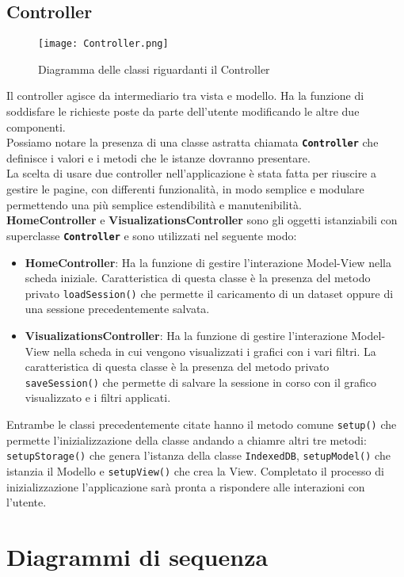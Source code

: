 \subsection{Controller}
\begin{figure}[ht]
	\centering
	\texttt{[image: Controller.png]}
	\caption{Diagramma delle classi riguardanti il Controller}
  \end{figure}
\label{controller}Il controller agisce da intermediario tra vista e modello. Ha la funzione di soddisfare le richieste poste da parte dell'utente modificando le altre due componenti.\\
Possiamo notare la presenza di una classe astratta chiamata \textbf{\texttt{Controller}} che definisce i valori e i metodi che le istanze dovranno presentare.\\
La scelta di usare due controller nell'applicazione è stata fatta per riuscire a gestire le pagine, con differenti funzionalità, in modo semplice e modulare permettendo una più semplice estendibilità e manutenibilità.\\
\textbf{HomeController} e \textbf{VisualizationsController} sono gli oggetti istanziabili con superclasse \textbf{\texttt{Controller}} e sono utilizzati nel seguente modo:
\begin{itemize}
	\item \textbf{HomeController}: Ha la funzione di gestire l'interazione Model-View nella scheda iniziale. Caratteristica di questa classe è la presenza del metodo privato \texttt{loadSession()} che permette il caricamento di un dataset oppure di una sessione precedentemente salvata.
	\item \textbf{VisualizationsController}: Ha la funzione di gestire l'interazione Model-View nella scheda in cui vengono visualizzati i grafici con i vari filtri. La caratteristica di questa classe è la presenza del metodo privato \texttt{saveSession()} che permette di salvare la sessione in corso con il grafico visualizzato e i filtri applicati.
\end{itemize}
Entrambe le classi precedentemente citate hanno il metodo comune \texttt{setup()} che permette l'inizializzazione della classe andando a chiamre altri tre metodi: \texttt{setupStorage()} che genera l'istanza della classe \texttt{IndexedDB}, \texttt{setupModel()} che istanzia il Modello e \texttt{setupView()} che crea la View. Completato il processo di inizializzazione l'applicazione sarà pronta a rispondere alle interazioni con l'utente.

\section{Diagrammi di sequenza}
